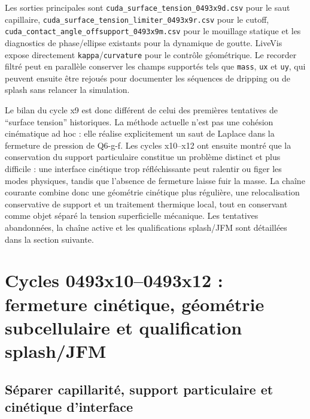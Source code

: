 \documentclass[11pt,a4paper]{article}
\begin{document}
Les sorties principales sont \texttt{cuda\_surface\_tension\_0493x9d.csv} pour le saut capillaire, \texttt{cuda\_surface\_tension\_limiter\_0493x9r.csv} pour le cutoff, \texttt{cuda\_contact\_angle\_offsupport\_0493x9m.csv} pour le mouillage statique et les diagnostics de phase/ellipse existants pour la dynamique de goutte. LiveVis expose directement \texttt{kappa}/\texttt{curvature} pour le contrôle géométrique. Le recorder filtré peut en parallèle conserver les champs supportés tels que \texttt{mass}, \texttt{ux} et \texttt{uy}, qui peuvent ensuite être rejoués pour documenter les séquences de dripping ou de splash sans relancer la simulation.

Le bilan du cycle x9 est donc différent de celui des premières tentatives de ``surface tension'' historiques. La méthode actuelle n'est pas une cohésion cinématique ad hoc : elle réalise explicitement un saut de Laplace dans la fermeture de pression de Q6-g-f. Les cycles x10--x12 ont ensuite montré que la conservation du support particulaire constitue un problème distinct et plus difficile : une interface cinétique trop réfléchissante peut ralentir ou figer les modes physiques, tandis que l'absence de fermeture laisse fuir la masse. La chaîne courante combine donc une géométrie cinétique plus régulière, une relocalisation conservative de support et un traitement thermique local, tout en conservant comme objet séparé la tension superficielle mécanique. Les tentatives abandonnées, la chaîne active et les qualifications splash/JFM sont détaillées dans la section suivante.




\section{Cycles 0493x10--0493x12 : fermeture cinétique, géométrie subcellulaire et qualification splash/JFM}
\label{sec:x10_x12_capillary_kinetic}

\subsection{Séparer capillarité, support particulaire et cinétique d'interface}
\end{document}
